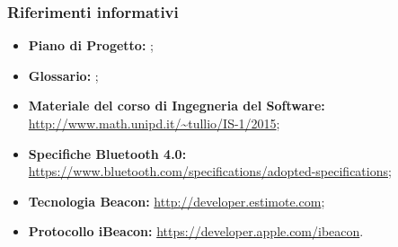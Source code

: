 \documentclass[../StudioDiFattibilita.tex]{subfiles}
\begin{document}
		\subsubsection{Riferimenti informativi}
		\begin{itemize}
			\item \textbf{Piano di Progetto:} \pianodiprogettov;
			\item \textbf{Glossario:} \glossariov;
			\item \textbf{Materiale del corso di Ingegneria del Software:}\\\url{http://www.math.unipd.it/~tullio/IS-1/2015};
			\item \textbf{Specifiche Bluetooth 4.0:}\\\url{https://www.bluetooth.com/specifications/adopted-specifications};
			\item \textbf{Tecnologia Beacon:} \url{http://developer.estimote.com};
			\item \textbf{Protocollo iBeacon:} \url{https://developer.apple.com/ibeacon}.
		\end{itemize}
\end{document}
